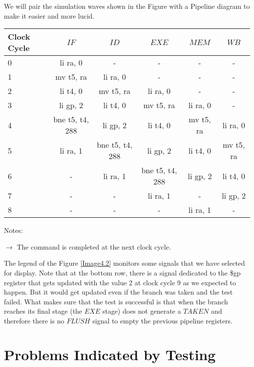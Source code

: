 We will pair the simulation waves shown in the Figure with a Pipeline diagram to make it easier and more lucid.\\
\vspace{4mm}
\begin{threeparttable}
	\footnotesize
	\begin{tabular}{|l|c|c|c|c|c|} \hline
		\setrow{\bfseries} Clock Cycle& \setrow{\bfseries} $IF$ & \setrow{\bfseries} $ID$ & \setrow{\bfseries} $EXE$ & \setrow{\bfseries} $MEM$ & $WB$ \\\hline
		0 & li ra, 0  & - & - & - & - 	   \\\hline
		1 & mv t5, ra & li ra, 0  & - & - & - \\\hline
		2 & li t4, 0  & mv t5, ra & li ra, 0 & - & - \\\hline
		3 & li gp, 2  & li t4, 0  & mv t5, ra & li ra, 0  & - \\\hline
		4 & bne t5, t4, 288 & li gp, 2 & li t4, 0 & mv t5, ra & \cellcolor{brightgreen} li ra, 0 \\\hline
		5 & li ra, 1  & bne t5, t4, 288 & li gp, 2  & li t4, 0   & \cellcolor{brightgreen} mv t5, ra \\\hline
		6 & - & li ra, 1  & \cellcolor{brightgreen}bne t5, t4, 288 & li gp, 2  & \cellcolor{brightgreen} li t4, 0  \\\hline
		7 & - & - & li ra, 1  & - & \cellcolor{brightgreen} li gp, 2 \\\hline
		8 & - & - & - & li ra, 1  & - \\\hline
			
	\end{tabular}
	
	\begin{tablenotes}
	\footnotesize
	\item Notes:
	
	\underline{\textbf{\textcolor{brightgreen}{$\rightarrow$}}} The command is completed at the next clock cycle.
	\label{Table4.1}
	\vspace{5mm}
	\end{tablenotes}

\end{threeparttable}

The legend of the Figure \ref{Image4.2} monitors some signals that we have selected for display. Note that at the bottom row, there is a signal dedicated to the \$gp register that gets updated with the value 2 at clock cycle 9 as we expected to happen. But it would get updated even if the branch was taken and the test failed. What makes sure that the test is successful is that when the branch reaches its final stage (the $EXE$ stage) does not generate a $TAKEN$ and therefore there is no $FLUSH$ signal to empty the previous pipeline registers. 

\clearpage

\section{Problems Indicated by Testing}
\label{SubSec4.3:PROBS}




 